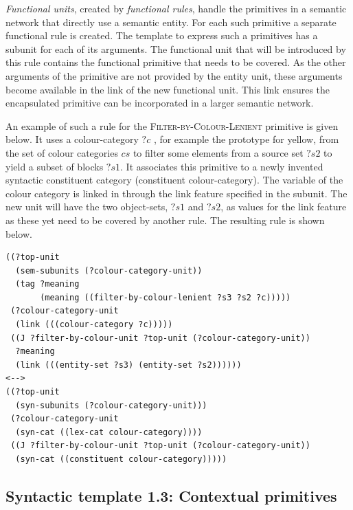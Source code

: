 \emph{Functional units}, created by \emph{functional rules}, handle
the primitives in a semantic network that directly use a semantic
entity. For each such primitive a separate functional rule is
created. The template to express such a primitives has a subunit for
each of its arguments. The functional unit that will be introduced by
this rule contains the functional primitive that needs to be covered.
As the other arguments of the primitive are not provided by the entity
unit, these arguments become available in the link of the new
functional unit. This link ensures the encapsulated primitive can be
incorporated in a larger semantic network.

An example of such a rule for the \textsc{Filter-by-Colour-Lenient}
primitive is given below. It uses a colour-category $?c$ , for example
the prototype for yellow, from the set of colour categories $cs$ to
filter some elements from a source set $?s2$ to yield a subset of
blocks $?s1$. It associates this primitive to a newly invented
syntactic constituent category (constituent colour-category).  The
variable of the colour category is linked in through the link feature 
specified in the subunit. The new unit will have the two object-sets,
$?s1$ and $?s2$, as values for the link feature 
as these yet need to be covered by
another rule. The resulting rule is shown below.

\footnotesize
\begin{Verbatim}[frame=lines, label=Functional rule for Filter-by-Colour-Lenient]
((?top-unit
  (sem-subunits (?colour-category-unit)) 
  (tag ?meaning
       (meaning ((filter-by-colour-lenient ?s3 ?s2 ?c)))))
 (?colour-category-unit 
  (link (((colour-category ?c)))))
 ((J ?filter-by-colour-unit ?top-unit (?colour-category-unit))
  ?meaning
  (link (((entity-set ?s3) (entity-set ?s2))))))
<-->
((?top-unit 
  (syn-subunits (?colour-category-unit)))
 (?colour-category-unit 
  (syn-cat ((lex-cat colour-category))))
 ((J ?filter-by-colour-unit ?top-unit (?colour-category-unit))
  (syn-cat ((constituent colour-category)))))
\end{Verbatim}
\normalsize

\subsection{Syntactic template 1.3: Contextual primitives}
\label{s:bcs-contextual-primitive}

